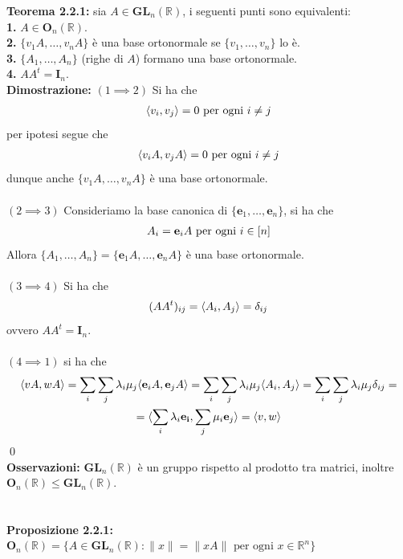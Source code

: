 \documentclass{article}
\begin{document}
\textbf{Teorema 2.2.1:} sia $A \in \mathbf{GL}_n(\mathbb{R})$, i seguenti punti sono equivalenti: \\
\textbf{1.} $A \in \mathbf{O}_n(\mathbb{R})$. \\
\textbf{2.} $\{ v_1A, \dots, v_nA \}$ è una base ortonormale se $\{ v_1, \dots, v_n \}$ lo è. \\
\textbf{3.} $\{ A_1, \dots, A_n \}$ (righe di $A$) formano una base ortonormale. \\
\textbf{4.} $AA^t = \mathbf{I}_n$. \\

\textbf{Dimostrazione:} $(1 \implies 2)$ Si ha che
\begin{gather}
    \langle v_i, v_j \rangle = 0 \text{ per ogni } i \neq j \notag
\end{gather}
per ipotesi segue che
\begin{gather}
    \langle v_iA, v_jA \rangle = 0 \text{ per ogni } i \neq j \notag
\end{gather}
dunque anche $\{ v_1A, \dots, v_nA \}$ è una base ortonormale. \\ \\
$(2 \implies 3)$ Consideriamo la base canonica di $\{ \mathbf{e}_1, \dots, \mathbf{e}_n \}$, si ha che
\begin{gather}
    A_i = \mathbf{e}_iA \text{ per ogni } i \in [n] \notag
\end{gather}
Allora $\{ A_1, \dots, A_n \} = \{ \mathbf{e}_1A, \dots, \mathbf{e}_nA \}$ è una base ortonormale. \\ \\
$(3 \implies 4)$ Si ha che
\begin{gather}
    (AA^t)_{ij} = \langle A_i, A_j \rangle  = \delta_{ij} \notag
\end{gather}
ovvero $AA^t = \mathbf{I}_n$. \\ \\
$(4 \implies 1)$ si ha che
\begin{gather}
    \langle vA, wA \rangle = \sum_i \sum_j \lambda_i\mu_j \langle \mathbf{e}_iA, \mathbf{e}_jA \rangle = \sum_i \sum_j \lambda_i\mu_j \langle A_i, A_j \rangle = \sum_i\sum_j \lambda_i\mu_j \delta_{ij} = \notag \\
    = \langle \sum_i \lambda_i\mathbf{e_i}, \sum_j \mu_i\mathbf{e}_j \rangle = \langle v, w \rangle \notag
\end{gather} \qed \\
\textbf{Osservazioni:} $\mathbf{GL}_n(\mathbb{R})$ è un gruppo rispetto al prodotto tra matrici, inoltre $\mathbf{O}_n(\mathbb{R}) \leq \mathbf{GL}_n(\mathbb{R})$. \\ \\ \\
\textbf{Proposizione 2.2.1:} $\mathbf{O}_n(\mathbb{R}) = \{ A \in \mathbf{GL}_n(\mathbb{R}) : \| x \| = \| xA \| \text{ per ogni } x \in \mathbb{R}^n \}$ \\
\end{document}
